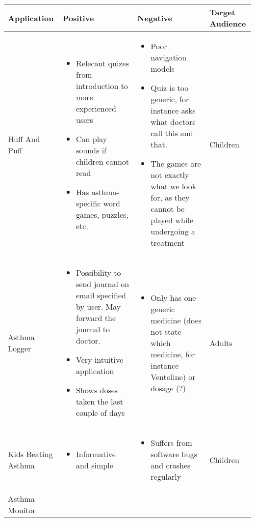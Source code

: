 \begin{sidewaystable}
	\label{tab:existing-product-table}
	\begin{tabular}{ | p{4.0cm} | p{5.5cm} | p{5.5cm} | p{4cm}|}
	\hline
	\textbf{Application} & \textbf{Positive} & \textbf{Negative} & \textbf{Target Audience} \\ \hline
	
   Huff And Puff 
	& 
	\begin{itemize}
	  \item Relecant quizes from introduction to more experienced users
	  \item Can play sounds if children cannot read
	  \item Has asthma-specific word games, puzzles, etc.  
	\end{itemize}
	&
	\begin{itemize}
	  \item Poor navigation models
	  \item Quiz is too generic, for instance asks what doctors call this and that.
	  \item The games are not exactly what we look for, as they cannot be played while undergoing a treatment  
	\end{itemize}
	&
	Children
	\\ \hline
	Asthma Logger
	& 
	\begin{itemize}
	  \item Possibility to send journal on email specified by user. May forward the journal to doctor.  
	  \item Very intuitive application
	  \item Shows doses taken the last couple of days
	\end{itemize}
	& 
	\begin{itemize}
	  \item Only has one generic medicine (does not state which medicine, for instance Ventoline) or dosage (?) 
	\end{itemize}
	& 
	Adults
	\\ \hline
	Kids Beating Asthma
	& 
	\begin{itemize}
	  \item Informative and simple
	\end{itemize}
	&
	\begin{itemize}
	  \item Suffers from software bugs and crashes regularly
	\end{itemize}
	& Children
	\\ \hline
	Asthma Monitor

\end{tabular}
\end{sidewaystable}
